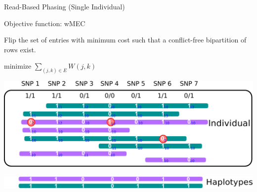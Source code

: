 \documentclass[notes=hide]{beamer}
\begin{document}
\begin{frame}{Read-Based Phasing (Single Individual)}
	\begin{center}
	\begin{block}{Objective function: \color{red}wMEC }

		Flip the set of entries with minimum cost such that a conflict-free bipartition of rows exist.
		\begin{center}
			minimize $\sum_{(j,k)\in E}W(j,k)$
		\end{center}
		
	\end{block}
		\bigskip
		\vspace*{.6mm}
		\includegraphics[scale=0.35]{figs/sih-phasing-complete4.pdf}\\
		\begin{center}
			\includegraphics[width=.9\textwidth]{figs/sih-phasing-complete-haplo-goal1}
		\end{center}
			
	\end{center}
\end{frame}

%		
%
\end{document}
